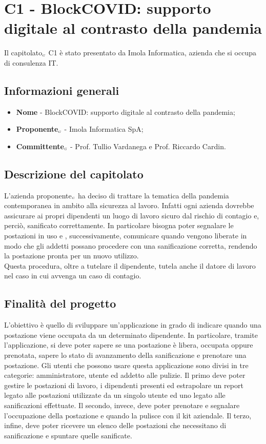 \chapter{C1 - BlockCOVID: supporto digitale al contrasto della pandemia} \label{CapitolatoC1}

Il capitolato$_{\scaleto{G}{3pt}}$ C1 è stato presentato da Imola Informatica, azienda che si occupa di consulenza IT.

\section{Informazioni generali} \label{C1InformazioniGenerali}
\begin{itemize}
	\item \textbf{Nome} - BlockCOVID: supporto digitale al contrasto della pandemia;
	\item \textbf{Proponente}$_{\scaleto{G}{3pt}}$ - Imola Informatica SpA;
	\item \textbf{Committente}$_{\scaleto{G}{3pt}}$ - Prof. Tullio Vardanega e Prof. Riccardo Cardin.
\end{itemize}
\section{Descrizione del capitolato} \label{C1DescrizioneDelCapitolato}
L'azienda proponente$_{\scaleto{G}{3pt}}$ ha deciso di trattare la tematica della pandemia contemporanea in ambito alla sicurezza al lavoro. Infatti ogni azienda dovrebbe assicurare ai propri dipendenti un luogo di lavoro sicuro dal rischio di contagio e, perciò, sanificato correttamente. In particolare bisogna poter segnalare le postazioni in uso e , successivamente, comunicare quando vengono liberate in modo che gli addetti possano procedere con una sanificazione corretta, rendendo la postazione pronta per un nuovo utilizzo.\\
Questa procedura, oltre a tutelare il dipendente, tutela anche il datore di lavoro nel caso in cui avvenga un caso di contagio.
\section{Finalità del progetto} \label{C1FinalitàDelProgetto}
L'obiettivo è quello di sviluppare un'applicazione in grado di indicare quando una postazione viene occupata da un determinato dipendente. In particolare, tramite l'applicazione, si deve poter sapere se una postazione è libera, occupata oppure prenotata, sapere lo stato di avanzamento della sanificazione e prenotare una postazione. Gli utenti che possono usare questa applicazione sono divisi in tre categorie: amministratore, utente ed addetto alle pulizie. Il primo deve poter gestire le postazioni di lavoro, i dipendenti presenti ed estrapolare un report legato alle postazioni utilizzate da un singolo utente ed uno legato alle sanificazioni effettuate. Il secondo, invece, deve poter prenotare e segnalare l'occupazione della postazione e quando la pulisce con il kit aziendale. Il terzo, infine, deve poter ricevere un elenco delle postazioni che necessitano di sanificazione e spuntare quelle sanificate.
